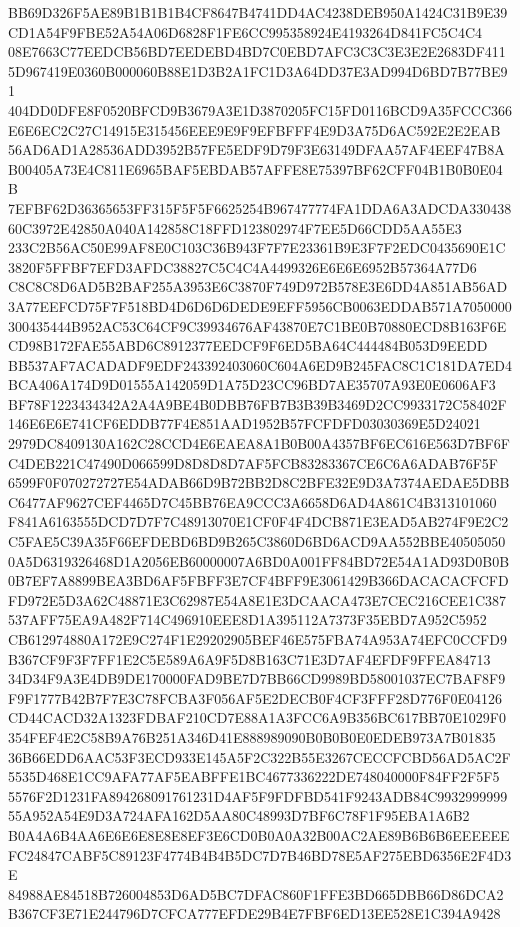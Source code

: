 \documentclass[UTF8,fontset=fandol,zihao=-4,a4paper]{ctexart}
\begin{document}
{{BB69D326F5AE89B1B1B1B4CF8647B4741DD4AC4238DEB950A1424C31B9E39CD1A54F9FBE52A54A06D6828F1FE6CC995358924E4193264D841FC5C4C4
08E7663C77EEDCB56BD7EEDEBD4BD7C0EBD7AFC3C3C3E3E2E2683DF4115D967419E0360B000060B88E1D3B2A1FC1D3A64DD37E3AD994D6BD7B77BE91
404DD0DFE8F0520BFCD9B3679A3E1D3870205FC15FD0116BCD9A35FCCC366E6E6EC2C27C14915E315456EEE9E9F9EFBFFF4E9D3A75D6AC592E2E2EAB
56AD6AD1A28536ADD3952B57FE5EDF9D79F3E63149DFAA57AF4EEF47B8AB00405A73E4C811E6965BAF5EBDAB57AFFE8E75397BF62CFF04B1B0B0E04B
7EFBF62D36365653FF315F5F5F6625254B967477774FA1DDA6A3ADCDA33043860C3972E42850A040A142858C18FFD123802974F7EE5D66CDD5AA55E3
233C2B56AC50E99AF8E0C103C36B943F7F7E23361B9E3F7F2EDC0435690E1C3820F5FFBF7EFD3AFDC38827C5C4C4A4499326E6E6E6952B57364A77D6
C8C8C8D6AD5B2BAF255A3953E6C3870F749D972B578E3E6DD4A851AB56AD3A77EEFCD75F7F518BD4D6D6D6DEDE9EFF5956CB0063EDDAB571A7050000
300435444B952AC53C64CF9C39934676AF43870E7C1BE0B70880ECD8B163F6ECD98B172FAE55ABD6C8912377EEDCF9F6ED5BA64C444484B053D9EEDD
BB537AF7ACADADF9EDF243392403060C604A6ED9B245FAC8C1C181DA7ED4BCA406A174D9D01555A142059D1A75D23CC96BD7AE35707A93E0E0606AF3
BF78F1223434342A2A4A9BE4B0DBB76FB7B3B39B3469D2CC9933172C58402F146E6E6E741CF6EDDB77F4E851AAD1952B57FCFDFD03030369E5D24021
2979DC8409130A162C28CCD4E6EAEA8A1B0B00A4357BF6EC616E563D7BF6FC4DEB221C47490D066599D8D8D8D7AF5FCB83283367CE6C6A6ADAB76F5F
6599F0F070272727E54ADAB66D9B72BB2D8C2BFE32E9D3A7374AEDAE5DBBC6477AF9627CEF4465D7C45BB76EA9CCC3A6658D6AD4A861C4B313101060
F841A6163555DCD7D7F7C48913070E1CF0F4F4DCB871E3EAD5AB274F9E2C2C5FAE5C39A35F66EFDEBD6BD9B265C3860D6BD6ACD9AA552BBE40505050
0A5D6319326468D1A2056EB60000007A6BD0A001FF84BD72E54A1AD93D0B0B0B7EF7A8899BEA3BD6AF5FBFF3E7CF4BFF9E3061429B366DACACACFCFD
FD972E5D3A62C48871E3C62987E54A8E1E3DCAACA473E7CEC216CEE1C387537AFF75EA9A482F714C496910EEE8D1A395112A7373F35EBD7A952C5952
CB612974880A172E9C274F1E29202905BEF46E575FBA74A953A74EFC0CCFD9B367CF9F3F7FF1E2C5E589A6A9F5D8B163C71E3D7AF4EFDF9FFEA84713
34D34F9A3E4DB9DE170000FAD9BE7D7BB66CD9989BD58001037EC7BAF8F9F9F1777B42B7F7E3C78FCBA3F056AF5E2DECB0F4CF3FFF28D776F0E04126
CD44CACD32A1323FDBAF210CD7E88A1A3FCC6A9B356BC617BB70E1029F0354FEF4E2C58B9A76B251A346D41E888989090B0B0B0E0EDEB973A7B01835
36B66EDD6AAC53F3ECD933E145A5F2C322B55E3267CECCFCBD56AD5AC2F5535D468E1CC9AFA77AF5EABFFE1BC4677336222DE748040000F84FF2F5F5
5576F2D1231FA894268091761231D4AF5F9FDFBD541F9243ADB84C993299999955A952A54E9D3A724AFA162D5AA80C48993D7BF6C78F1F95EBA1A6B2
B0A4A6B4AA6E6E6E8E8E8EF3E6CD0B0A0A32B00AC2AE89B6B6B6EEEEEEFC24847CABF5C89123F4774B4B4B5DC7D7B46BD78E5AF275EBD6356E2F4D3E
84988AE84518B726004853D6AD5BC7DFAC860F1FFE3BD665DBB66D86DCA2B367CF3E71E244796D7CFCA777EFDE29B4E7FBF6ED13EE528E1C394A9428
}}
\end{document}
